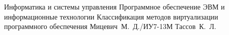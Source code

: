 \documentclass{bmstu}
\begin{document}
\makeresearchtitle
{Информатика и системы управления} %
{Программное обеспечение ЭВМ и информационные технологии} %
{Классификация методов виртуализации программного обеспечения} %
{Мицевич~М.~Д./ИУ7-13М} %
{Тассов~К.~Л.} %
{} %




\maketableofcontents

%
%



%
%
%


\makebibliography

%
\end{document}
